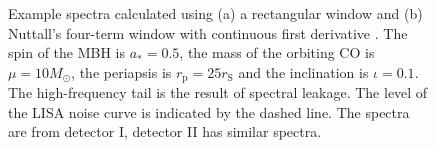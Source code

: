 \documentclass[useAMS,usedcolumn,usegraphicx,usenatbib]{mn2e}
\newcommand{\sub}[1]{\ensuremath{_\mathrm{#1}}}
\begin{document}
\begin{figure}
  \begin{center}
    \quad
    \caption{Example spectra calculated using (a) a rectangular window and (b) Nuttall's four-term window with continuous first derivative \citep{Nuttall1981}. The spin of the MBH is $a_\ast = 0.5$, the mass of the orbiting CO is $\mu = 10 M_\odot$, the periapsis is $r\sub{p} = 25 r\sub{S}$ and the inclination is $\iota = 0.1$. The high-frequency tail is the result of spectral leakage. The level of the LISA noise curve is indicated by the dashed line. The spectra are from detector I, detector II has similar spectra.}
    \label{fig:Windowing}
  \end{center}
\end{figure}
\end{document}
